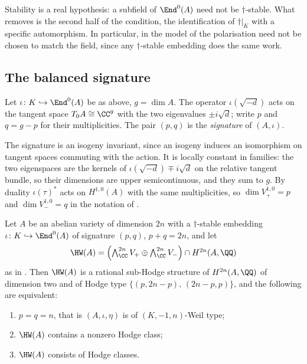 \begin{remark}\label{rem:whystable}
Stability is a real hypothesis: a subfield of $\End^{0}(A)$ need not be
$\dagger$-stable. What  removes is the second half of the
condition, the identification of $\dagger|_{K}$ with a specific automorphism.
In particular, in the model of  the polarisation need not be
chosen to match the field, since any $\dagger$-stable embedding does the same
work.
\end{remark}

\subsection{The balanced signature}

\begin{definition}[Signature]\label{def:signature}
Let $\iota\colon K\hookrightarrow\End^{0}(A)$ be as above, $g=\dim A$. The
operator $\iota(\sqrt{-d})$ acts on the tangent space $T_{0}A\cong\CC^{g}$ with
the two eigenvalues $\pm i\sqrt{d}$; write $p$ and $q=g-p$ for their
multiplicities. The pair $(p,q)$ is the \emph{signature} of $(A,\iota)$.
\end{definition}

The signature is an isogeny invariant, since an isogeny induces an isomorphism
on tangent spaces commuting with the action. It is locally constant in
families: the two eigenspaces are the kernels of
$\iota(\sqrt{-d})\mp i\sqrt{d}$ on the relative tangent bundle, so their
dimensions are upper semicontinuous, and they sum to $g$. By
duality $\iota(\tau)^{*}$ acts on $H^{1,0}(A)$ with the same multiplicities, so
$\dim V^{1,0}_{+}=p$ and $\dim V^{1,0}_{-}=q$ in the notation of
.

\begin{proposition}\label{prop:signatureforced}
Let $A$ be an abelian variety of dimension $2n$ with a $\dagger$-stable
embedding $\iota\colon K\hookrightarrow\End^{0}(A)$ of signature $(p,q)$,
$p+q=2n$, and let
\[
  \HW(A)=\Bigl(\textstyle\bigwedge^{2n}_{\CC}V_{+}
   \oplus\bigwedge^{2n}_{\CC}V_{-}\Bigr)\cap H^{2n}(A,\QQ)
\]
as in . Then $\HW(A)$ is a rational sub-Hodge structure of
$H^{2n}(A,\QQ)$ of dimension two and of Hodge type
$\{(p,2n-p),\,(2n-p,p)\}$, and the following are equivalent:
\begin{enumerate}[label=\textup{(\roman*)},nosep]
\item $p=q=n$, that is $(A,\iota,\eta)$ is of $(K,-1,n)$-Weil type;
\item $\HW(A)$ contains a nonzero Hodge class;
\item $\HW(A)$ consists of Hodge classes.
\end{enumerate}
\end{proposition}

